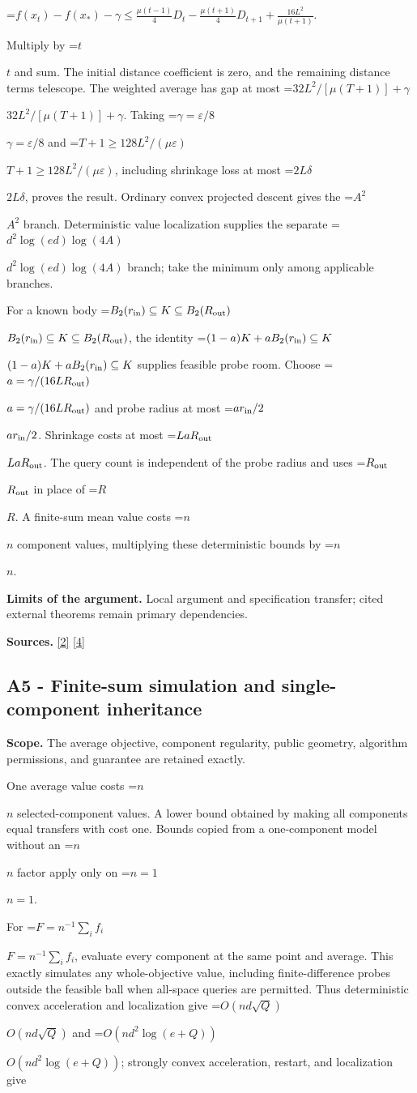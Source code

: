 \documentclass[10pt,a4paper]{article}
\newcommand{\AtlasMath}[1]{\par\begingroup\centering\setbox0=\hbox{$\displaystyle #1$}\ifdim\wd0>1.4\linewidth\typeout{ATLAS WIDE FORMULA: \the\wd0}\fi\ifdim\wd0>\linewidth\resizebox{\linewidth}{!}{\box0}\else\box0\fi\par\endgroup}
\newcommand{\AtlasInlineMath}[1]{\begingroup\setbox0=\hbox{$#1$}\ifdim\wd0>.4\linewidth\endgroup\AtlasMath{#1}\else\endgroup$#1$\fi}
\begin{document}
\AtlasMath{f(x_t)-f(x_*)-\gamma\le\frac{\mu(t-1)}4D_t-\frac{\mu(t+1)}4D_{t+1}+\frac{16L^2}{\mu(t+1)}.}

Multiply by \AtlasInlineMath{t} and sum. The initial distance coefficient is zero, and the remaining distance terms telescope. The weighted average has gap at most \AtlasInlineMath{32L^2/[\mu(T+1)]+\gamma}. Taking \AtlasInlineMath{\gamma=\varepsilon/8} and \AtlasInlineMath{T+1\ge128L^2/(\mu\varepsilon)}, including shrinkage loss at most \AtlasInlineMath{2L\delta}, proves the result. Ordinary convex projected descent gives the \AtlasInlineMath{A^2} branch. Deterministic value localization supplies the separate \AtlasInlineMath{d^2\log(ed)\log(4A)} branch; take the minimum only among applicable branches.

For a known body \AtlasInlineMath{B_2(r_{\rm in})\subseteq K\subseteq B_2(R_{\rm out})}, the identity \AtlasInlineMath{(1-a)K+aB_2(r_{\rm in})\subseteq K} supplies feasible probe room. Choose \AtlasInlineMath{a=\gamma/(16LR_{\rm out})} and probe radius at most \AtlasInlineMath{ar_{\rm in}/2}. Shrinkage costs at most \AtlasInlineMath{LaR_{\rm out}}. The query count is independent of the probe radius and uses \AtlasInlineMath{R_{\rm out}} in place of \AtlasInlineMath{R}. A finite-sum mean value costs \AtlasInlineMath{n} component values, multiplying these deterministic bounds by \AtlasInlineMath{n}.

\textbf{Limits of the argument.} Local argument and specification transfer; cited external theorems remain primary dependencies.

\textbf{Sources.} \href{https://arxiv.org/html/2607.16558v2}{[2]} \href{https://www.mathnet.ru/php/archive.phtml?jrnid=mzm&option_lang=eng&paperid=1697&wshow=paper}{[4]}

\subsection{A5 - Finite-sum simulation and single-component inheritance}
\textbf{Scope.} The average objective, component regularity, public geometry, algorithm permissions, and guarantee are retained exactly.

One average value costs \AtlasInlineMath{n} selected-component values. A lower bound obtained by making all components equal transfers with cost one. Bounds copied from a one-component model without an \AtlasInlineMath{n} factor apply only on \AtlasInlineMath{n=1}.

For \AtlasInlineMath{F=n^{-1}\sum_i f_i}, evaluate every component at the same point and average. This exactly simulates any whole-objective value, including finite-difference probes outside the feasible ball when all-space queries are permitted. Thus deterministic convex acceleration and localization give \AtlasInlineMath{O(nd\sqrt Q)} and \AtlasInlineMath{O(nd^2\log(e+Q))}; strongly convex acceleration, restart, and localization give
\end{document}
